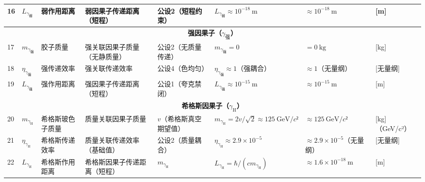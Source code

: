 \documentclass{article}
\begin{document}
\begin{table}[h!]
{\begin{tabular}{l l l l l l l l}
16            & \(L_{\gamma_{\text{弱}}}\) & 弱作用距离          & 弱因果子传递距离（短程）        & 公设2（短程约束）       & \(L_{\gamma_{\text{弱}}} ≈ 10^{-18}\ \text{m}\) & \(≈10^{-18}\ \text{m}\)          & [m]                \\
\midrule
\multicolumn{8}{c}{\textbf{强因果子（\(\gamma_{\text{强}}\)）}} \\
17            & \(m_{\gamma_{\text{强}}}\) & 胶子质量            & 强关联因果子质量（无静质量）    & 公设2（无质量传递）     & \(m_{\gamma_{\text{强}}} = 0\)              & \(=0\ \text{kg}\)                & [kg]               \\
18            & \(\eta_{\gamma_{\text{强}}}\) & 强传递效率          & 强关联传递效率                  & 公设4（色均匀）         & \(\eta_{\gamma_{\text{强}}} ≈ 1\)（强耦合） & \(≈1\)（无量纲）                  & [无量纲]           \\
19            & \(L_{\gamma_{\text{强}}}\) & 强作用距离          & 强因果子传递距离（短程）        & 公设1（夸克禁闭）       & \(L_{\gamma_{\text{强}}} ≈ 10^{-15}\ \text{m}\) & \(≈10^{-15}\ \text{m}\)          & [m]                \\
\midrule
\multicolumn{8}{c}{\textbf{希格斯因果子（\(\gamma_{\text{H}}\)）}} \\
20            & \(m_{\gamma_{\text{H}}}\) & 希格斯玻色子质量    & 质量关联因果子质量              & \(v\)（希格斯真空期望值） & \(m_{\gamma_{\text{H}}} = 2v/\sqrt{2}≈125\ \text{GeV}/c²\) & \(≈125\ \text{GeV}/c²\)          & [kg]（GeV/c²）     \\
21            & \(\eta_{\gamma_{\text{H}}}\) & 希格斯传递效率      & 质量关联传递效率（基础值）      & 公设2（质量耦合）       & \(\eta_{\gamma_{\text{H}}} ≈ 2.9×10^{-5}\)  & \(≈2.9×10^{-5}\)（无量纲）        & [无量纲]           \\
22            & \(L_{\gamma_{\text{H}}}\) & 希格斯作用距离      & 希格斯因果子传递距离（短程）    & \(m_{\gamma_{\text{H}}}\) & \(L_{\gamma_{\text{H}}} = \hbar/(c m_{\gamma_{\text{H}}})\) & \(≈1.6×10^{-18}\ \text{m}\)      & [m]                \\
\bottomrule
\end{tabular}%
}
\end{table}
\end{document}

